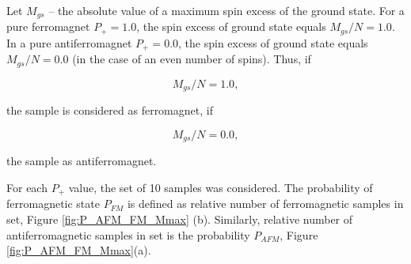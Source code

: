 \documentclass[preprint,12pt]{elsarticle}
\begin{document}
	Let $M_{gs}$ -- the absolute value of a maximum spin excess of the ground state. For a pure ferromagnet $P_+ = 1.0$, the spin excess of ground state equals $M_{gs}/N = 1.0$. In a pure antiferromagnet $P_+ = 0.0$, the spin excess of ground state equals $M_{gs}/N = 0.0$ (in the case of an even number of spins). Thus, if
		
	\begin{equation}
		M_{gs}/N = 1.0,
		\label{eq:ferr_deffinition}
	\end{equation}
		
	\noindent the sample is considered as ferromagnet, if
	
	\begin{equation}
		M_{gs}/N = 0.0,
		\label{eq:aferr_deffinition}
	\end{equation}
	
	\noindent the sample as antiferromagnet.
	
	For each $P_+$ value, the set of 10 samples was considered. The probability of ferromagnetic state $P_{FM}$ is defined as relative number of ferromagnetic samples in set, Figure \ref{fig:P_AFM_FM_Mmax} (b). Similarly, relative number of antiferromagnetic samples in set is the probability $P_{AFM}$, Figure \ref{fig:P_AFM_FM_Mmax}(a).
	
\end{document}
